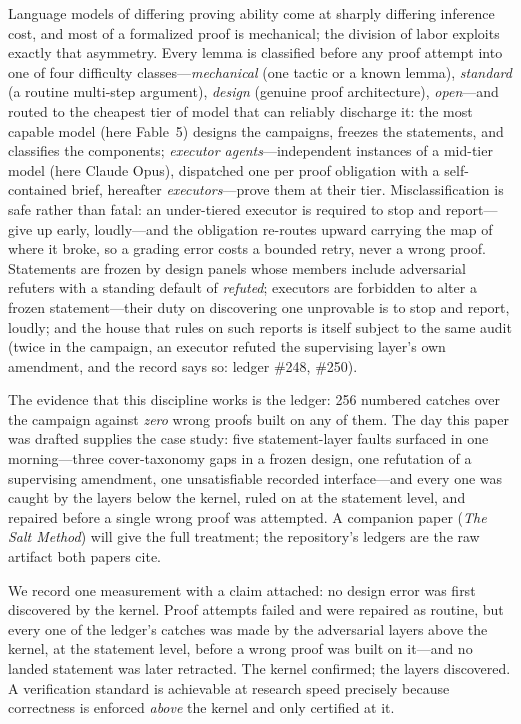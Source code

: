 \documentclass{CUP-JNL-FMP}
\theoremstyle{remark}
\begin{document}
Language models of differing proving ability come at sharply differing
inference cost, and most of a formalized proof is mechanical; the
division of labor exploits exactly that asymmetry. Every lemma is
classified before any proof attempt into one of four difficulty
classes---\emph{mechanical} (one tactic or a known lemma),
\emph{standard} (a routine multi-step argument), \emph{design}
(genuine proof architecture), \emph{open}---and routed to the cheapest
tier of model that can reliably discharge it: the most capable model
(here Fable~5) designs the campaigns, freezes the statements, and
classifies the components; \emph{executor agents}---independent
instances of a mid-tier model (here Claude Opus), dispatched one per
proof obligation with a self-contained brief, hereafter
\emph{executors}---prove them at their tier. Misclassification is safe rather than fatal: an
under-tiered executor is required to stop and report---give up early,
loudly---and the obligation re-routes upward carrying the map of where
it broke, so a grading error costs a bounded retry, never a wrong
proof. Statements are frozen by design panels whose members include
adversarial refuters with a standing default of \emph{refuted}; executors
are forbidden to alter a frozen statement---their duty on discovering one
unprovable is to stop and report, loudly; and the house that rules on such
reports is itself subject to the same audit (twice in the campaign, an
executor refuted the supervising layer's own amendment, and the record
says so: ledger \#248, \#250).

The evidence that this discipline works is the ledger: 256 numbered
catches over the campaign against \emph{zero} wrong proofs built on any of
them. The day this paper was drafted supplies the case study: five
statement-layer faults surfaced in one morning---three cover-taxonomy
gaps in a frozen design, one refutation of a supervising amendment, one
unsatisfiable recorded interface---and every one was caught by the layers
below the kernel, ruled on at the statement level, and repaired before a
single wrong proof was attempted. A companion paper (\emph{The Salt
Method}) will give the full treatment; the repository's ledgers are the
raw artifact both papers cite.

We record one measurement with a claim attached: no design error was
first discovered by the kernel. Proof attempts failed and were repaired
as routine, but every one of the ledger's catches was made by the
adversarial layers above the kernel, at the statement level, before a
wrong proof was built on it---and no landed statement was later
retracted. The kernel confirmed; the layers discovered. A verification standard is achievable at research
speed precisely because correctness is enforced \emph{above} the kernel
and only certified at it.
\end{document}
